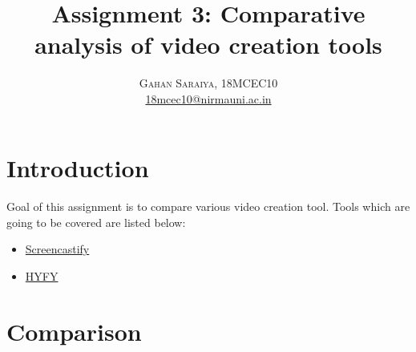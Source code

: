 \documentclass[paper=letter, fontsize=12pt]{article}
\title{\vspace{-15mm}\fontsize{24pt}{10pt}\selectfont\textbf{Assignment 3: Comparative analysis of video creation tools}} %
\author{
	\large
	{\textsc{Gahan Saraiya, 18MCEC10 }}\\[2mm]
	\normalsize \href{mailto:18mcec10@nirmauni.ac.in}{18mcec10@nirmauni.ac.in}\\[2mm] %
}
\date{}
\newcommand*\arrow{\item[$\Rightarrow$]}
\newcommand*{\screencastify}{\href{https://www.screencastify.com}{Screencastify}}
\newcommand*{\hyfy}{\href{https://www.hyfy.io}{HYFY}}
\begin{document}
	\maketitle %
	\thispagestyle{fancy} %
	
	
	\section{Introduction}
	\paragraph{} Goal of this assignment is to compare various video creation tool.
	Tools which are going to be covered are listed below:
	\begin{itemize}
		\arrow \screencastify
		\arrow \hyfy
	\end{itemize}
	
	\section{Comparison}
	
\end{document}

